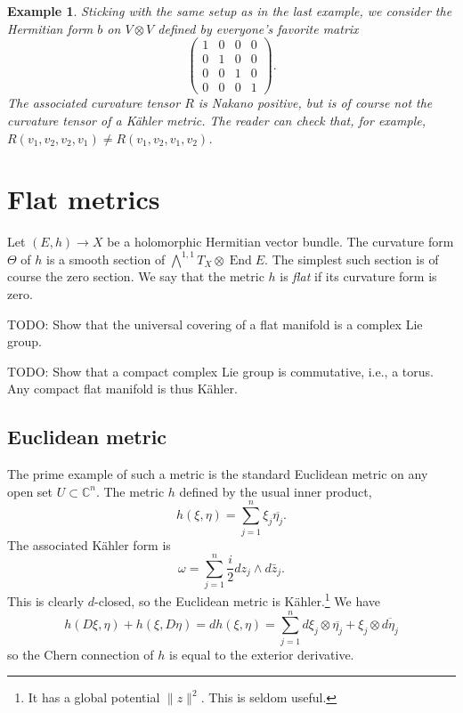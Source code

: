 \documentclass[10pt,a4paper]{article}
\newtheorem{exam}[theo]{Example}
\newcommand{\kk}[1]{\mathbb{#1}}
\DeclareMathOperator{\End}{End}
\begin{document}
\begin{exam}
  Sticking with the same setup as in the last example, we consider the Hermitian form $b$ on $V \otimes V$ defined by everyone's favorite matrix
$$
\begin{pmatrix}
  1 & 0 & 0 & 0 \\
  0 & 1 & 0 & 0 \\
  0 & 0 & 1 & 0 \\
  0 & 0 & 0 & 1
\end{pmatrix}.
$$
The associated curvature tensor $R$ is Nakano positive, but is of course not the curvature tensor of a K\"ahler metric. The reader can check that, for example, $R(v_1,v_2,v_2,v_1) \not= R(v_1,v_2,v_1,v_2)$.
\end{exam}


\section{Flat metrics}
\label{sec:org504b250}

Let $(E,h) \to X$ be a holomorphic Hermitian vector bundle. The curvature form $\Theta$ of $h$ is a smooth section of $\bigwedge^{1,1}T_X \otimes \End E$. The simplest such section is of course the zero section. We say that the metric $h$ is \emph{flat} if its curvature form is zero.


TODO: Show that the universal covering of a flat manifold is a complex Lie group.

TODO: Show that a compact complex Lie group is commutative, i.e., a torus. Any compact flat manifold is thus K\"ahler.


\subsection{Euclidean metric}

The prime example of such a metric is the standard Euclidean metric on any open set $U \subset \kk C^n$. The metric $h$ defined by the usual inner product,
$$
h(\xi, \eta) = \sum_{j=1}^n \xi_j \overline{\eta_j}.
$$
The associated K\"ahler form is
$$
\omega = \sum_{j=1}^n \frac{i}{2} dz_j \wedge d\bar z_j.
$$
This is clearly $d$-closed, so the Euclidean metric is K\"ahler.\footnote{It has a global potential $\|z\|^2$. This is seldom useful.} We have
$$
h(D\xi, \eta) + h(\xi, D\eta)
= d h(\xi, \eta)
= \sum_{j=1}^n d\xi_j \otimes \overline{\eta_j} + \xi_j \otimes \overline{d\eta_j}
$$
so the Chern connection of $h$ is equal to the exterior derivative.

\end{document}
